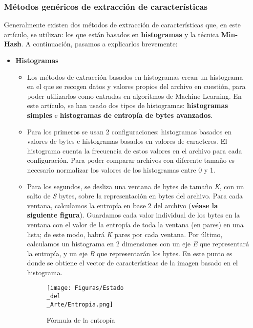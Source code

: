 \subsubsection{Métodos genéricos de extracción de características}

Generalmente existen dos métodos de extracción de características que, en este artículo, se utilizan: los que están basados en \textbf{histogramas} y la técnica \textbf{Min-Hash}. A continuación, pasamos a explicarlos brevemente:

\begin{itemize}
\item \textbf{Histogramas}
\begin{itemize}
\item Los métodos de extracción basados en histogramas crean un histograma en el que se recogen datos y valores propios del archivo en cuestión, para poder utilizarlos como entradas en algoritmos de Machine Learning. En este artículo, se han usado dos tipos de histogramas: \textbf{histogramas simples} e \textbf{histogramas de entropía de bytes avanzados}.
\item Para los primeros se usan 2 configuraciones: histogramas basados en valores de bytes e histogramas basados en valores de caracteres. El histograma cuenta la frecuencia de estos valores en el archivo para cada configuración. Para poder comparar archivos con diferente tamaño es necesario normalizar los valores de los histogramas entre 0 y 1.
\item Para los segundos, se desliza una ventana de bytes de tamaño \textit{K}, con un salto de \textit{S} bytes, sobre la representación en bytes del archivo. Para cada ventana, calculamos la entropía en base 2 del archivo (\textbf{véase la siguiente figura}). Guardamos cada valor individual de los bytes en la ventana con el valor de la entropía de toda la ventana (en pares) en una lista; de este modo, habrá \textit{K} pares por cada ventana. Por último, calculamos un histograma en 2 dimensiones con un eje \textit{E} que representará la entropía, y un eje \textit{B} que representarán los bytes. En este punto es donde se obtiene el vector de características de la imagen basado en el histograma.

\begin{figure}[H]
  \centering
  \texttt{[image: Figuras/Estado\\\_del\\\_Arte/Entropia.png]}
  \label{fig:entropia}
  \caption{Fórmula de la entropía}
\end{figure}


\end{itemize}
\end{itemize}
